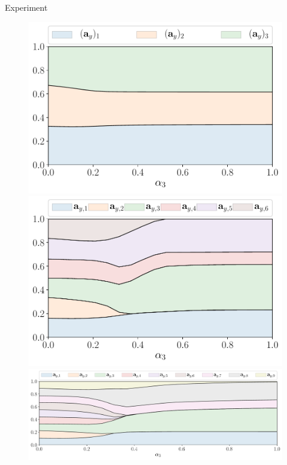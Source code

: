 \documentclass[9pt]{beamer}
\begin{document}
\begin{frame}{Experiment}
\begin{figure}
	\begin{minipage}{.5\linewidth}
			\includegraphics[width=\linewidth]{figs/features_vs_alpha_ecog_3.pdf}
	\end{minipage}%
	\begin{minipage}{.5\linewidth}
			\includegraphics[width=\linewidth]{figs/features_vs_alpha_ecog_6.pdf}
	\end{minipage}\par\medskip
		\includegraphics[width=\linewidth]{figs/features_vs_alpha_ecog_9.pdf}
\end{figure}
\end{frame}
\end{document}
